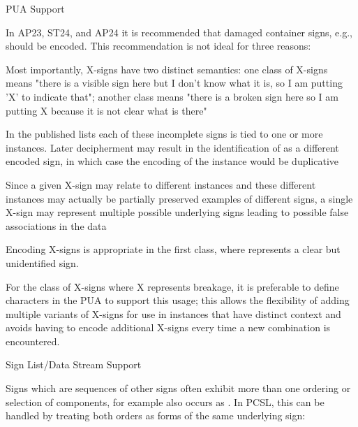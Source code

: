 \Hhhh{}PUA Support


\par In AP23, ST24, and AP24 it is recommended that damaged
      container signs, e.g.,  should be
      encoded. This recommendation is not ideal for three
      reasons:

\Hol\Hli{}Most importantly, X-signs have two distinct semantics: one
	class of X-signs means "there is a visible sign here but I
	don't know what it is, so I am putting 'X' to indicate that";
	another class means "there is a broken sign here so I am
	putting X because it is not clear what is there"

\Hli{}In the published lists each of these incomplete signs is
	tied to one or more instances. Later decipherment may result in
	the identification of  as a different
	encoded sign, in which case the encoding of the instance would
	be duplicative

\Hli{}Since a given X-sign may relate to different instances and
	these different instances may actually be partially preserved
	examples of different signs, a single X-sign may represent
	multiple possible underlying signs leading to possible false
	associations in the data

\Hendol

\par Encoding X-signs is appropriate in the first class, where
       represents a clear but unidentified sign.


\par For the class of X-signs where X represents breakage, it is
      preferable to define characters in the PUA to support this
      usage; this allows the flexibility of adding multiple variants
      of X-signs for use in instances that have distinct context and
      avoids having to encode additional X-signs every time a new
       combination is encountered.

\Hhhh{}Sign List/Data Stream Support


\par Signs which are sequences of other signs often exhibit more
      than one ordering or selection of components, for example
       also occurs as
      .  In PCSL, this can be handled by
      treating both orders as forms of the same underlying sign:


